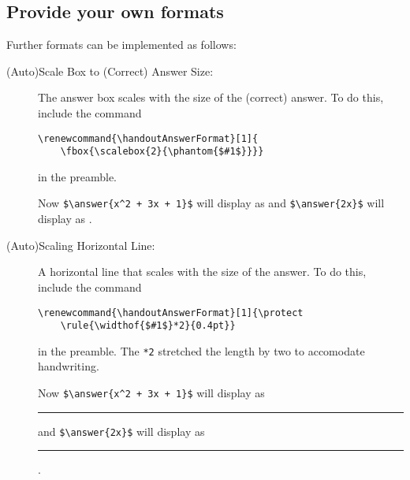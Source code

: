 \documentclass{ximera}
\begin{document}
        
    \subsection*{Provide your own formats}

        Further formats can be implemented as follows:

        \begin{description}
            \item[(Auto)Scale Box to (Correct) Answer Size:] The answer box scales with the size of the (correct) answer. To do this, include the command 
            \begin{verbatim}
\renewcommand{\handoutAnswerFormat}[1]{
    \fbox{\scalebox{2}{\phantom{$#1$}}}}
            \end{verbatim}
            in the preamble. 
            
            Now \verb|$\answer{x^2 + 3x + 1}$| will display as \fbox{\scalebox{2}{\phantom{$x^2 + 3x + 1$}}} and \verb|$\answer{2x}$| will display as \fbox{\scalebox{2}{\phantom{$2x$}}}.
                
            \item[(Auto)Scaling Horizontal Line:] A horizontal line that scales with the size of the answer. To do this, include the command 
            \begin{verbatim}
\renewcommand{\handoutAnswerFormat}[1]{\protect
    \rule{\widthof{$#1$}*2}{0.4pt}}
            \end{verbatim}
            in the preamble. The \verb|*2| stretched the length by two to accomodate handwriting.

            Now \verb|$\answer{x^2 + 3x + 1}$| will display as
            \rule{*2}{0.4pt} and \verb|$\answer{2x}$| will display as \rule{*2}{0.4pt}.



        \end{description}
    
                

    
\end{document}

